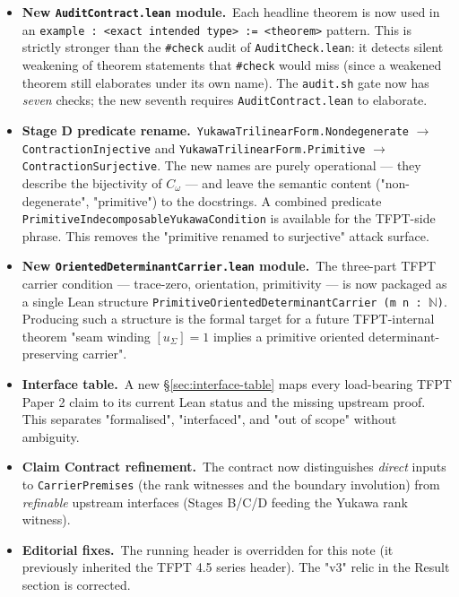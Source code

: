 \begin{itemize}[leftmargin=1.6em, itemsep=2pt]
\item \textbf{New \texttt{AuditContract.lean} module.}\ Each
    headline theorem is now used in an
    \texttt{example : <exact intended type> := <theorem>}
    pattern. This is strictly stronger than the \texttt{\#check}
    audit of \texttt{AuditCheck.lean}: it detects silent
    weakening of theorem statements that \texttt{\#check} would
    miss (since a weakened theorem still elaborates under its
    own name). The \texttt{audit.sh} gate now has \emph{seven}
    checks; the new seventh requires
    \texttt{AuditContract.lean} to elaborate.

\item \textbf{Stage D predicate rename.}\
    \texttt{YukawaTrilinearForm.Nondegenerate} $\to$
    \texttt{ContractionInjective} and
    \texttt{YukawaTrilinearForm.Primitive} $\to$
    \texttt{ContractionSurjective}. The new names are purely
    operational --- they describe the bijectivity of
    $C_\omega$ --- and leave the semantic content
    ("non-degenerate", "primitive") to the docstrings. A
    combined predicate
    \texttt{PrimitiveIndecomposableYukawaCondition} is
    available for the TFPT-side phrase. This removes the
    "primitive renamed to surjective" attack surface.

\item \textbf{New
    \texttt{OrientedDeterminantCarrier.lean} module.}\
    The three-part TFPT carrier condition --- trace-zero,
    orientation, primitivity --- is now packaged as a single
    Lean structure
    \texttt{PrimitiveOrientedDeterminantCarrier (m n : \(\mathbb N\))}.
    Producing such a structure is the formal target for
    a future TFPT-internal theorem
    "seam winding $[u_\Sigma] = 1$ implies a primitive oriented
    determinant-preserving carrier".

\item \textbf{Interface table.}\ A new
    \S\ref{sec:interface-table} maps every load-bearing TFPT
    Paper 2 claim to its current Lean status and the missing
    upstream proof. This separates "formalised", "interfaced",
    and "out of scope" without ambiguity.

\item \textbf{Claim Contract refinement.}\ The contract now
    distinguishes \emph{direct} inputs to
    \texttt{CarrierPremises} (the rank witnesses and the
    boundary involution) from \emph{refinable} upstream
    interfaces (Stages B/C/D feeding the Yukawa rank witness).

\item \textbf{Editorial fixes.}\ The running header is
    overridden for this note (it previously inherited the
    TFPT 4.5 series header). The "v3" relic in the Result
    section is corrected.
\end{itemize}

